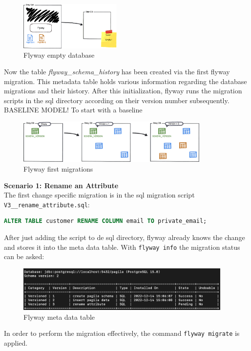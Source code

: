 \begin{figure}[H]
	\centering
	\includegraphics[width=0.45\textwidth]{./chapters/scenarios/images/EmptyDb}
	\caption[Flyway empty database - Source: \cite{FlywayGetStarted}]{Flyway empty database}
	 \label{fig:flyway_empty_db}
\end{figure}
Now the table \textit{flyway\_schema\_history} has been created via the first flyway migration. This metadata table holds various information regarding the database migrations and their history. After this initialization, flyway runs the migration scripts in the sql directory according on their version number subsequently. 
BASELINE MODEL! To start with a baseline

\begin{figure}[H]
	\centering
	\includegraphics[width=0.85\textwidth]{./chapters/scenarios/images/Migration-1-2}
	\caption[Flyway first migrations - Source: \cite{FlywayGetStarted}]{Flyway first migrations}
	\label{fig:Migration-1-2}
\end{figure}

\textbf{Scenario 1: Rename an Attribute}\\
%
The first change specific migration is in the sql migration script\\ \texttt{V3\_\_rename\_attribute.sql}:
\begin{lstlisting}[language=SQL]
ALTER TABLE customer RENAME COLUMN email TO private_email;
\end{lstlisting}
After just adding the script to de sql directory, flyway already knows the change and stores it into the meta data table. With \texttt{flyway info} the migration status can be asked:

\begin{figure}[H]
	\centering
	\includegraphics[width=0.95\textwidth]{./chapters/scenarios/images/flyway_metadata_v2}
	\caption[Flyway meta data table - Source: Own illustration]{Flyway meta data table}
\end{figure}
In order to perform the migration effectively, the command \texttt{flyway migrate} is applied.



